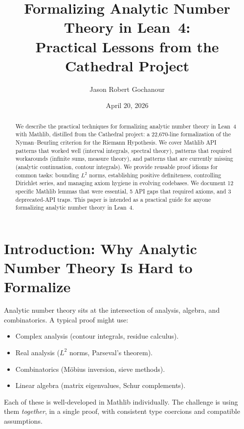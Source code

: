 \documentclass[11pt,a4paper]{article}
\title{%
  Formalizing Analytic Number Theory in Lean~4:\\
  Practical Lessons from the Cathedral Project%
}
\author{
  Jason Robert Gochanour
}
\date{April 20, 2026}
\begin{document}
\maketitle

\begin{abstract}
We describe the practical techniques for formalizing analytic number
theory in Lean~4 with Mathlib, distilled from the Cathedral project:
a 22,670-line formalization of the Nyman--Beurling criterion for the
Riemann Hypothesis. We cover Mathlib API patterns that worked well
(interval integrals, spectral theory), patterns that required
workarounds (infinite sums, measure theory), and patterns that are
currently missing (analytic continuation, contour integrals). We
provide reusable proof idioms for common tasks: bounding $L^2$ norms,
establishing positive definiteness, controlling Dirichlet series,
and managing axiom hygiene in evolving codebases. We document 12
specific Mathlib lemmas that were essential, 5 API gaps that required
axioms, and 3 deprecated-API traps. This paper is intended as a
practical guide for anyone formalizing analytic number theory in
Lean~4.
\end{abstract}

\tableofcontents

\section{Introduction: Why Analytic Number Theory Is Hard to Formalize}
\label{sec:intro}

Analytic number theory sits at the intersection of analysis, algebra,
and combinatorics. A typical proof might use:

\begin{itemize}
  \item Complex analysis (contour integrals, residue calculus).
  \item Real analysis ($L^2$ norms, Parseval's theorem).
  \item Combinatorics (M\"obius inversion, sieve methods).
  \item Linear algebra (matrix eigenvalues, Schur complements).
\end{itemize}

Each of these is well-developed in Mathlib individually. The challenge
is using them \emph{together}, in a single proof, with consistent
type coercions and compatible assumptions.
\end{document}
